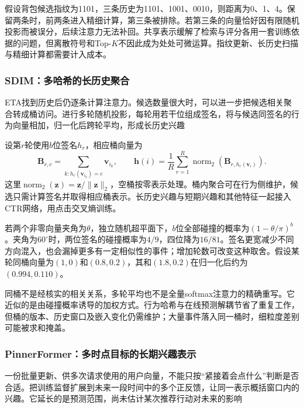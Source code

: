 假设背包候选指纹为1101，三条历史为1101、1001、0010，则距离为0、1、4。保留两条时，前两条进入精细计算，第三条被排除。若第三条的向量恰好因有限随机投影而被误分，后续注意力无法补回。共享表示缓解了检索与评分各用一套训练依据的问题，但离散符号和Top-$K$不因此成为处处可微运算。指纹更新、长历史扫描与精细计算都需要计入成本。

\subsubsection{SDIM：多哈希的长历史聚合}
\label{sec:rs-sdim}

ETA找到历史后仍逐条计算注意力。候选数量很大时，可以进一步把候选相关聚合转成桶访问。进行多轮随机投影，每轮用若干位组成签名，将与候选同签名的行为向量相加，归一化后跨轮平均，形成长历史兴趣

设第$r$轮使用$b$位签名$h_r$，相应桶向量为
\begin{equation}
  \bm{B}_{r,c}=\sum_{k:h_r(\bm{v}_{i_k})=c}\bm{v}_{i_k},\qquad
  \bm{h}(i)=\frac{1}{R}\sum_{r=1}^{R}
       \operatorname{norm}_2(\bm{B}_{r,h_r(\bm{v}_i)}).
  \label{eq:rs-sdim-buckets}
\end{equation}
这里$\operatorname{norm}_2(\bm{z})=\bm{z}/\lVert\bm{z}\rVert_2$，空桶按零表示处理。桶内聚合可在行为侧维护，候选只需计算签名并取得相应桶表示。长历史兴趣与短期兴趣和其他特征一起接入CTR网络，用点击交叉熵训练。

若两个非零向量夹角为$\theta$，独立随机超平面下，$b$位全部碰撞的概率为$(1-\theta/\pi)^b$。夹角为$60^\circ$时，两位签名的碰撞概率为$4/9$，四位降为$16/81$。签名更宽减少不同方向混入，也会漏掉更多有一定相似性的事件；增加轮数可改变这种取舍。假设某轮同桶向量为$(1,0)$和$(0.8,0.2)$，其和$(1.8,0.2)$在归一化后约为$(0.994,0.110)$。

同桶不是经核实的相关关系，多轮平均也不是全量softmax注意力的精确重写。它近似的是由碰撞概率诱导的加权方式。行为哈希与在线预测解耦节省了重复工作，但桶的版本、历史窗口及嵌入变化仍需维护；大量事件落入同一桶时，细粒度差别可能被求和掩盖。

\subsubsection{PinnerFormer：多时点目标的长期兴趣表示}
\label{sec:rs-pinnerformer}

一份批量更新、供多次请求使用的用户向量，不能只按“紧接着会点什么”判断是否合适。把训练监督扩展到未来一段时间中的多个正反馈，让同一表示概括窗口内的兴趣。它延长的是预测范围，尚未估计某次推荐行动对未来的影响

